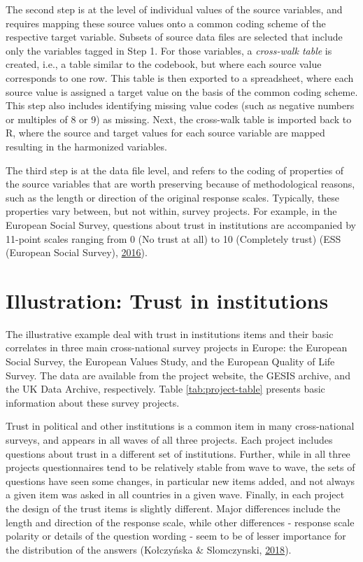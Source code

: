 \documentclass[12pt,]{article}
\begin{document}
The second step is at the level of individual values of the source variables, and requires mapping these source values onto a common coding scheme of the respective target variable. Subsets of source data files are selected that include only the variables tagged in Step 1. For those variables, a \emph{cross-walk table} is created, i.e., a table similar to the codebook, but where each source value corresponds to one row. This table is then exported to a spreadsheet, where each source value is assigned a target value on the basis of the common coding scheme. This step also includes identifying missing value codes (such as negative numbers or multiples of 8 or 9) as missing. Next, the cross-walk table is imported back to R, where the source and target values for each source variable are mapped resulting in the harmonized variables.

The third step is at the data file level, and refers to the coding of properties of the source variables that are worth preserving because of methodological reasons, such as the length or direction of the original response scales. Typically, these properties vary between, but not within, survey projects. For example, in the European Social Survey, questions about trust in institutions are accompanied by 11-point scales ranging from 0 (No trust at all) to 10 (Completely trust) (ESS (European Social Survey), \protect\hyperlink{ref-ESSEuropeanSocialSurvey2016b}{2016}).

\hypertarget{illustration-trust-in-institutions}{%
\section{Illustration: Trust in institutions}\label{illustration-trust-in-institutions}}

The illustrative example deal with trust in institutions items and their basic correlates in three main cross-national survey projects in Europe: the European Social Survey, the European Values Study, and the European Quality of Life Survey. The data are available from the project website, the GESIS archive, and the UK Data Archive, respectively. Table \ref{tab:project-table} presents basic information about these survey projects.

Trust in political and other institutions is a common item in many cross-national surveys, and appears in all waves of all three projects. Each project includes questions about trust in a different set of institutions. Further, while in all three projects questionnaires tend to be relatively stable from wave to wave, the sets of questions have seen some changes, in particular new items added, and not always a given item was asked in all countries in a given wave. Finally, in each project the design of the trust items is slightly different. Major differences include the length and direction of the response scale, while other differences - response scale polarity or details of the question wording - seem to be of lesser importance for the distribution of the answers (Kołczyńska \& Slomczynski, \protect\hyperlink{ref-KolczynskaSlomczynski2018}{2018}).
\end{document}
